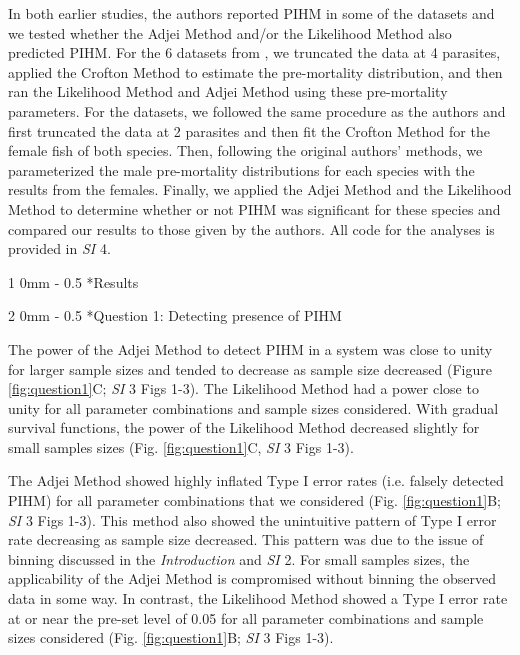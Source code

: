 \documentclass[12pt, a4paper]{article}
\makeatletter
\renewcommand{\section}{\@startsection
{section}%
{1}%
{0mm}%
{-\baselineskip}%
{0.5\baselineskip}%
{\normalfont\bf\large}} %
\renewcommand{\subsection}{\@startsection
{subsection}%
{2}%
{0mm}%
{-\baselineskip}%
{0.5\baselineskip}%
{\normalfont\bf}} %
\makeatother
\begin{document}
In both earlier studies, the authors reported PIHM in some of the datasets and we tested whether the Adjei
Method and/or the Likelihood Method also predicted PIHM. For the 6 datasets from
\cite{Crofton1971a}, we truncated the data at 4 parasites, applied the Crofton
Method to estimate the pre-mortality distribution, and then ran the Likelihood
Method and Adjei Method using these pre-mortality parameters.  For the
\cite{Adjei1986} datasets, we followed the same procedure as the authors and
first truncated the data at 2 parasites and then fit the Crofton Method for the
female fish of both species.  Then, following the original authors' methods, we parameterized the male pre-mortality
distributions for each species with the results from the females.  Finally, we
applied the Adjei Method and the Likelihood Method to determine whether or not
PIHM was significant for these species and compared our results to those given by the authors.  All code for the analyses is provided in \emph{SI} 4.

\section*{Results}

\subsection*{Question 1: Detecting presence of PIHM}

The power of the Adjei Method to detect PIHM in a
system was close to unity for larger sample sizes and tended to
decrease as sample size decreased (Figure \ref{fig:question1}C; \emph{SI} 3 Figs 1-3).  The Likelihood Method had a power close to
unity for all parameter combinations and sample sizes considered.  With gradual
survival functions, the power of the Likelihood Method decreased slightly for small samples sizes (Fig. \ref{fig:question1}C, \emph{SI} 3 Figs 1-3).

The Adjei Method showed highly inflated Type I error rates (i.e. falsely detected
PIHM) for all parameter combinations that we
considered (Fig. \ref{fig:question1}B; \emph{SI} 3 Figs 1-3).  This method also showed the unintuitive pattern of Type I error
rate decreasing as sample size decreased.  This pattern was due to the issue of
binning discussed in the \emph{Introduction} and \emph{SI} 2. For small samples sizes, the
applicability of the Adjei Method is compromised without binning the observed
data in some way.  In contrast, the Likelihood Method showed a Type I
error rate at or near the pre-set level of 0.05 for all parameter combinations
and sample sizes considered (Fig. \ref{fig:question1}B; \emph{SI} 3 Figs 1-3).
\end{document}
